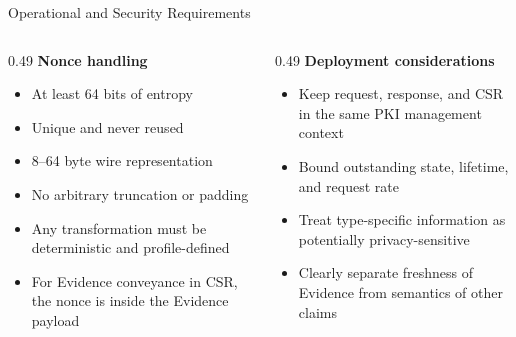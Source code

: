 \documentclass[aspectratio=169,10pt]{beamer}
\begin{document}
\begin{frame}{Operational and Security Requirements}
  \begin{columns}[T,onlytextwidth]
    \begin{column}{0.49\textwidth}
      \textbf{Nonce handling}
      \begin{itemize}
        \item At least 64 bits of entropy
        \item Unique and never reused
        \item 8--64 byte wire representation
        \item No arbitrary truncation or padding
        \item Any transformation must be deterministic and profile-defined
        \item For Evidence conveyance in CSR, the nonce is inside the Evidence payload
      \end{itemize}
    \end{column}
    \begin{column}{0.49\textwidth}
      \textbf{Deployment considerations}
      \begin{itemize}
        \item Keep request, response, and CSR in the same PKI management context
        \item Bound outstanding state, lifetime, and request rate
        \item Treat type-specific information as potentially privacy-sensitive
        \item Clearly separate freshness of Evidence from semantics of other claims
      \end{itemize}
    \end{column}
  \end{columns}
\end{frame}
\end{document}
